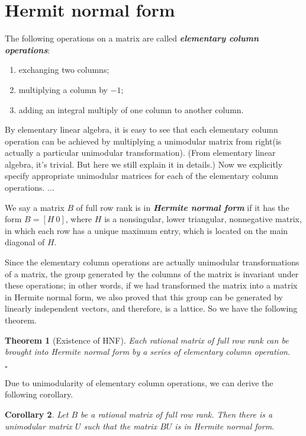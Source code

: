 \documentclass{article}
\newcounter{lecnum}
\newtheorem{theorem}{Theorem}[lecnum]
\newtheorem{corollary}[theorem]{Corollary}
\newenvironment{proof}{{\it Proof.}}{ \hfill $\square$}
\begin{document}
\section{Hermit normal form}
The following operations on a matrix are called \emph{\textbf{elementary column operations}}:
\begin{enumerate}[(1)]
\item exchanging two columns;
\item multiplying a column by $-1$;
\item adding an integral multiply of one column to another column.
\end{enumerate}

By elementary linear algebra, it is easy to see that each elementary column operation can be achieved by multiplying a unimodular matrix from right(is actually a particular unimodular transformation). (From elementary linear algebra, it's trivial. But here we still explain it in details.) Now we explicitly specify appropriate unimodular matrices for each of the elementary column operations. ...

We say a matrix $B$ of full row rank is in \emph{\textbf{Hermite normal form}} if it has the form $B=[H~0]$, where $H$ is a nonsingular, lower triangular, nonnegative matrix, in which each row has a unique maximum entry, which is located on the main diagonal of $H$.

Since the elementary column operations are actually unimodular transformations of a matrix, the group generated by the columns of the matrix is invariant under these operations; in other words, if we had transformed the matrix into a matrix in Hermite normal form, we also proved that this group can be generated by linearly independent vectors, and therefore, is a lattice. So we have the following theorem.

\begin{theorem}[Existence of HNF]
Each rational matrix of full row rank can be brought into Hermite normal form by a series of elementary column operation.
\end{theorem}
\begin{proof}
\end{proof}

Due to unimodularity of elementary column operations, we can derive the following corollary.

\begin{corollary}
Let $B$ be a rational matrix of full row rank. Then there is a unimodular matrix $U$ such that the matrix $BU$ is in Hermite normal form.
\end{corollary}
\end{document}
